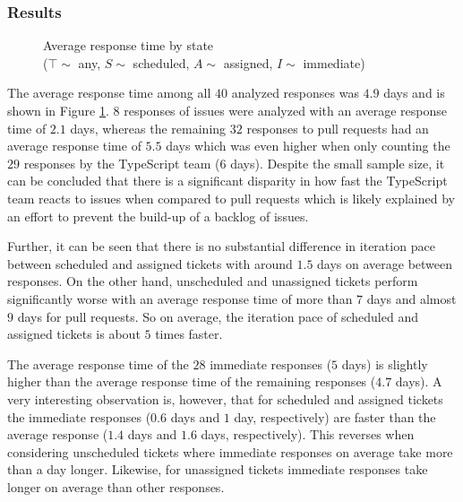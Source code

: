 \documentclass[12pt]{scrartcl}
\begin{document}
\subsubsection{Results}

\begin{figure}
    \centering
    \caption{Average response time by state \\ ($\top \sim$ any, $S \sim$ scheduled, $A \sim$ assigned, $I \sim$ immediate)}
    \label{fig:response_time_states}
\end{figure}

The average response time among all $40$ analyzed responses was $4.9$ days and is shown in Figure \ref{fig:response_time_states}. $8$ responses of issues were analyzed with an average response time of $2.1$ days, whereas the remaining $32$ responses to pull requests had an average response time of $5.5$ days which was even higher when only counting the $29$ responses by the TypeScript team ($6$ days). Despite the small sample size, it can be concluded that there is a significant disparity in how fast the TypeScript team reacts to issues when compared to pull requests which is likely explained by an effort to prevent the build-up of a backlog of issues.

Further, it can be seen that there is no substantial difference in iteration pace between scheduled and assigned tickets with around $1.5$ days on average between responses. On the other hand, unscheduled and unassigned tickets perform significantly worse with an average response time of more than $7$ days and almost $9$ days for pull requests. So on average, the iteration pace of scheduled and assigned tickets is about $5$ times faster.

The average response time of the $28$ immediate responses ($5$ days) is slightly higher than the average response time of the remaining responses ($4.7$ days). A very interesting observation is, however, that for scheduled and assigned tickets the immediate responses ($0.6$ days and $1$ day, respectively) are faster than the average response ($1.4$ days and $1.6$ days, respectively). This reverses when considering unscheduled tickets where immediate responses on average take more than a day longer. Likewise, for unassigned tickets immediate responses take longer on average than other responses.
\end{document}
